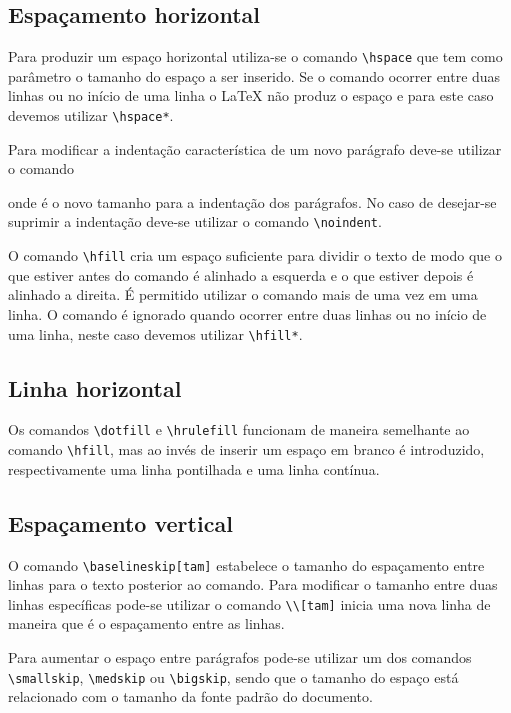 \subsection{Espaçamento horizontal}
Para produzir um espaço horizontal utiliza-se o comando
\lstinline!\hspace! que tem como
parâmetro o tamanho do espaço a ser inserido. Se o comando ocorrer entre duas
linhas ou no início de uma linha o LaTeX não produz o espaço e para este caso
devemos utilizar  \lstinline!\hspace*!.

Para modificar a indentação característica de um novo parágrafo deve-se utilizar
o comando
\begin{code}
  \setlength{\parident}{tam}
\end{code} 
onde  é o novo tamanho para a indentação dos parágrafos. No caso de
desejar-se suprimir a indentação deve-se utilizar o comando
\lstinline!\noindent!.

O comando \lstinline!\hfill! cria um espaço suficiente para dividir o texto de
modo que o que estiver antes do comando é alinhado a esquerda e o que estiver
depois é alinhado a direita. É permitido utilizar o comando mais de uma vez em
uma linha. O comando é ignorado quando ocorrer entre duas linhas ou no início de
uma linha, neste caso devemos utilizar \lstinline!\hfill*!.

\subsection{Linha horizontal}
Os comandos \lstinline!\dotfill! e \lstinline!\hrulefill! funcionam de maneira
semelhante ao comando \lstinline!\hfill!, mas ao invés de inserir um espaço em
branco é introduzido, respectivamente uma linha pontilhada e uma linha contínua.

\subsection{Espaçamento vertical}
O comando \lstinline!\baselineskip[tam]! estabelece o tamanho do espaçamento
entre linhas para o texto posterior ao comando. Para modificar o tamanho entre
duas linhas específicas pode-se utilizar o comando \lstinline!\\[tam]! inicia
uma nova linha de maneira que  é o espaçamento entre as linhas.

Para aumentar o espaço entre parágrafos pode-se utilizar um dos comandos
\lstinline!\smallskip!, \lstinline!\medskip! ou \lstinline!\bigskip!, sendo que
o tamanho do espaço está relacionado com o tamanho da fonte padrão do documento.

